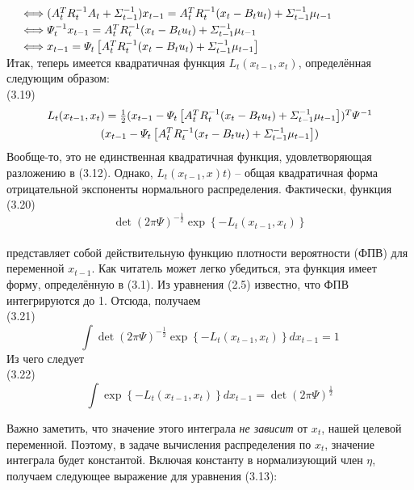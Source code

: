 \documentclass[10pt,a4paper]{article}
\begin{document}
$\hspace{5mm}\Longleftrightarrow (A_t^T R_t^{-1}A_t +\varSigma_{t-1}^{-1})x_{t-1}=A_t^T R_t^{-1}(x_t-B_t u_t)+\varSigma_{t-1}^{-1}\mu_{t-1}$\\

$\hspace{5mm}\Longleftrightarrow \varPsi_t^{-1}x_{t-1}=A_t^T R_t^{-1}(x_t-B_t u_t)+\varSigma_{t-1}^{-1}\mu_{t-1}$\\

$\hspace{5mm}\Longleftrightarrow x_{t-1}=\varPsi_t\left[A_t^T R_t^{-1}(x_t-B_t u_t)+\varSigma_{t-1}^{-1}\mu_{t-1}\right] $\\

Итак, теперь имеется квадратичная функция $L_t(x_{t-1}, x_t)$, определённая следующим образом:\\

(3.19)
\begin{multline*}
$$L_t(x_{t-1},x_t)=\frac{1}{2}(x_{t-1}-\varPsi_t\left[A_t^T R_t^{-1}(x_t-B_t u_t)+\varSigma_{t-1}^{-1}\mu_{t-1}\right])^T \varPsi^{-1}\\ (x_{t-1}-\varPsi_t\left[A_t^T R_t^{-1}(x_t-B_t u_t)+\varSigma_{t-1}^{-1}\mu_{t-1}\right]) 
 $$ 
\end{multline*}
Вообще-то, это не единственная квадратичная функция, удовлетворяющая разложению в (3.12). Однако, $L_t(x_{t-1}, x)t)$ –  общая квадратичная форма отрицательной экспоненты нормального распределения. Фактически, функция\\

(3.20)
$$\det(2\pi\varPsi)^{-\frac{1}{2}}\exp\left\lbrace-L_t(x_{t-1},x_t)\right\rbrace$$\\
представляет собой действительную функцию плотности вероятности (ФПВ) для переменной $x_{t-1}$. Как читатель может легко убедиться, эта функция имеет форму, определённую в (3.1). Из уравнения (2.5) известно, что ФПВ интегрируются до 1. Отсюда, получаем\\

(3.21)
$$\int\det(2\pi\varPsi)^{-\frac{1}{2}}\exp\left\lbrace -L_t(x_{t-1},x_t)\right\rbrace dx_{t-1}=1$$
Из чего следует\\

(3.22)
$$\int\exp\left\lbrace -L_t(x_{t-1},x_t)\right\rbrace dx_{t-1}=\det(2\pi\varPsi)^{\frac{1}{2}}$$

Важно заметить, что значение этого интеграла \textit{не зависит} от $x_t$, нашей целевой переменной. Поэтому, в задаче вычисления распределения по $x_t$, значение интеграла будет константой. Включая константу в нормализующий член $\eta$, получаем следующее выражение для уравнения (3.13):\\
\end{document}
